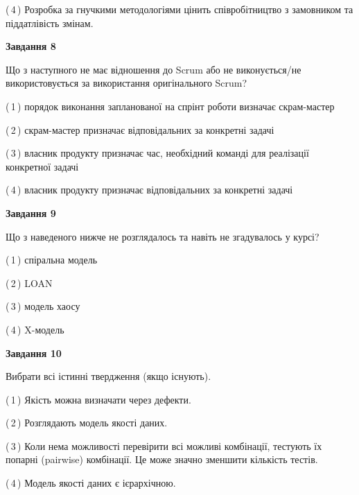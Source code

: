 \documentclass[10pt, ukrainian]{article}
\begin{document}
{\begin {large}
(\,4\,) Розробка за гнучкими методологіями цінить співробітництво з замовником та піддатлівість змінам. %


{\begin {center}\textbf{Завдання 8}\end {center}}\par
Що з наступного не має відношення до Scrum або не виконується/не використовується за використання оригінального Scrum?\par
\vspace{2mm}



(\,1\,) порядок виконання запланованої на спрінт роботи визначає скрам-мастер%



(\,2\,) скрам-мастер призначає відповідальних за конкретні задачі%



(\,3\,) власник продукту призначає час, необхідний команді для реалізації конкретної задачі%



(\,4\,) власник продукту призначає відповідальних за конкретні задачі%


{\begin {center}\textbf{Завдання 9}\end {center}}\par
Що з наведеного нижче не розглядалось та навіть не згадувалось у курсі?\par
\vspace{2mm}



(\,1\,) спіральна модель%



(\,2\,) LOAN%



(\,3\,) модель хаосу%



(\,4\,) X-модель%


{\begin {center}\textbf{Завдання 10}\end {center}}\par
Вибрати всі істинні твердження (якщо існують).\par
\vspace{2mm}



(\,1\,) Якість можна визначати через дефекти.%



(\,2\,) Розглядають модель якості даних.%



(\,3\,) Коли нема можливості перевірити всі можливі комбінації, тестують їх попарні (pairwise) комбінації. Це може значно зменшити кількість тестів.%



(\,4\,) Модель якості даних є ієрархічною.%



\end {large}}
\end{document}
